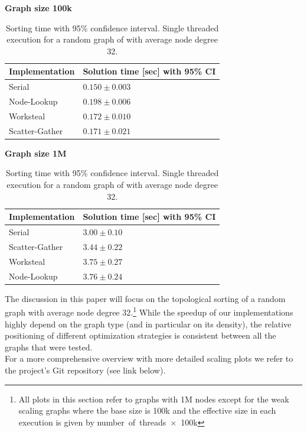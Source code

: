   \begin{table}[h]
	  \textbf{Graph size 100k}
    \centering
    \begin{tabular}{ll}
		Implementation	& Solution time [sec] with 95\% CI \\
    \toprule
    Serial				& $0.150 \pm 0.003$ \\
	Node-Lookup			& $0.198 \pm 0.006$ \\
	Worksteal			& $0.172 \pm 0.010$ \\
	Scatter-Gather		& $0.171 \pm 0.021$ \\
    \bottomrule
    \end{tabular}
    \par\medskip
	  \textbf{Graph size 1M}
    \begin{tabular}{ll}
		Implementation	& Solution time [sec] with 95\% CI \\
    \toprule
    Serial				& $3.00 \pm 0.10$ \\
    Scatter-Gather		& $3.44 \pm 0.22$ \\
    Worksteal			& $3.75 \pm 0.27$ \\
    Node-Lookup			& $3.76 \pm 0.24$ \\
    \bottomrule
    \end{tabular}
    \caption{Sorting time with 95\% confidence interval. Single threaded execution for a random graph of with average node degree 32.}
    \label{tab:abstimings}
  \end{table}
\par\medskip
The discussion in this paper will focus on the topological sorting of a random graph with average node degree 32.\footnote{All plots in this section refer to graphs with 1M nodes except for the weak scaling graphs where the base size is 100k and the effective size in each execution is given by number~of~threads~$\times$~100k} 
While the speedup of our implementations highly depend on the graph type (and in particular on its density), the relative positioning of different optimization strategies is consistent between all the graphs that were tested. \\
For a more comprehensive overview with more detailed scaling plots we refer to the project's Git repository (see link below).

